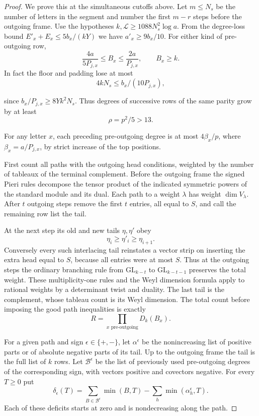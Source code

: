 \begin{proof}
We prove this at the simultaneous cutoffs above. Let \(m\le N_s\)
be the number of letters in the segment and number the first
\(m-r\) steps before the outgoing frame. Use the hypotheses
\(k,\mathcal L\ge1088N_s^2\log a\). From the degree-loss bound
\(E'_x+E_x\le5b_x/(kY)\) we have \(a'_x\ge9b_x/10\).
For either kind of pre-outgoing row,
\[
 \frac{4a}{5P_{j,x}}\le B_x\le\frac{2a}{P_{j,x}},\qquad B_x\ge k.
\]
In fact the floor and padding lose at most
\[
 4kN_s\le b_x/(10P_{j,x}),
\]

since \(b_x/P_{j,x}\ge8Yk^2N_s\). Thus degrees of successive
rows of the same parity grow by at least
\[
 \rho=p^2/5>13.
\]

For any letter \(x\), each preceding pre-outgoing degree is at
most \(4\beta_x/p\), where \(\beta_x=a/P_{j,x}\), by strict
increase of the top positions.

First count all paths with the outgoing head conditions,
weighted by the number of tableaux of the terminal complement.
Before the outgoing frame the signed Pieri rules decompose the
tensor product of the indicated symmetric powers of the standard
module and its dual. Each path to a weight \(\lambda\) has weight
\(\dim V_\lambda\). After \(t\) outgoing steps remove the first \(t\)
entries, all equal to \(S\), and call the remaining row list the
tail.

At the next step its old and new tails \(\eta,\eta'\) obey
\[
 \eta_i\ge\eta'_i\ge\eta_{i+1}.
\]
Conversely every such
interlacing tail reinstates a vector strip on inserting the
extra head equal to \(S\), because all entries were at most
\(S\). Thus at the outgoing steps the ordinary branching rule
from \(\mathrm{GL}_{k-t}\) to \(\mathrm{GL}_{k-t-1}\) preserves the
total weight. These multiplicity-one rules and the Weyl dimension
formula apply to rational weights by a determinant twist and
duality. \cite{fulton-harris}
The last tail is the complement, whose tableau count is its
Weyl dimension. The total count before imposing the good path
inequalities is exactly
\[
 R=\prod_{x\text{ pre-outgoing}}D_k(B_x).
\]


For a given path and sign \(\epsilon\in\{+,-\}\), let
\(\alpha^\epsilon\) be the nonincreasing list of positive parts
or of absolute negative parts of its tail. Up to the outgoing
frame the tail is the full list of \(k\) rows. Let \(\mathcal B^\epsilon\)
be the list of previously used pre-outgoing degrees of the
corresponding sign, with vectors positive and covectors negative.
For every \(T\ge0\) put
\[
 \delta_\epsilon(T)=\sum_{B\in\mathcal B^\epsilon}\min(B,T)
                    -\sum_h\min(\alpha^\epsilon_h,T).
\]
Each of these deficits starts at zero and is nondecreasing along
the path.


\end{proof}
